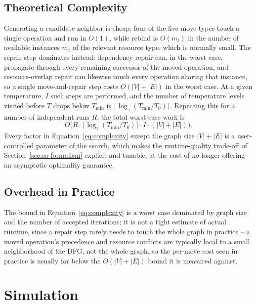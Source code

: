 \documentclass[conference]{IEEEtran}
\begin{document}
    \subsection{Theoretical Complexity}
    \label{sec:overhead-theory}

    Generating a candidate neighbor is cheap: four of the five move types touch a single operation
    and run in $O(1)$, while rebind is $O(m_t)$ in the number of available instances $m_t$ of the
    relevant resource type, which is normally small. The repair step dominates instead: dependency
    repair can, in the worst case, propagate through every remaining successor of the moved operation,
    and resource-overlap repair can likewise touch every operation sharing that instance, so a single
    move-and-repair step costs $O(|V| + |E|)$ in the worst case. At a given temperature, $I$ such steps
    are performed, and the number of temperature levels visited before $T$ drops below $T_{\min}$ is
    $\lceil \log_\gamma (T_{\min} / T_0) \rceil$. Repeating this for a number of independent runs
    $R$, the total worst-case work is
    \begin{equation}
        O\Big(R \cdot \big\lceil \log_\gamma (T_{\min}/T_0) \big\rceil \cdot I \cdot (|V| + |E|)\Big).
        \label{eq:complexity}
    \end{equation}
    Every factor in Equation~\eqref{eq:complexity} except the graph size $|V| + |E|$ is a
    user-controlled parameter of the search, which makes the runtime-quality trade-off of
    Section~\ref{sec:sa-formalism} explicit and tunable, at the cost of no longer offering an
    asymptotic optimality guarantee.

    \subsection{Overhead in Practice}
    \label{sec:overhead-empirical}

    The bound in Equation~\eqref{eq:complexity} is a worst case dominated by graph size and the
    number of accepted iterations; it is not a tight estimate of actual runtime, since a repair step
    rarely needs to touch the whole graph in practice -- a moved operation's precedence and
    resource conflicts are typically local to a small neighborhood of the DFG, not the whole
    graph, so the per-move cost seen in practice is usually far below the $O(|V|+|E|)$ bound it is
    measured against.

    \section{Simulation}
    \label{sec:simulation}
\end{document}
